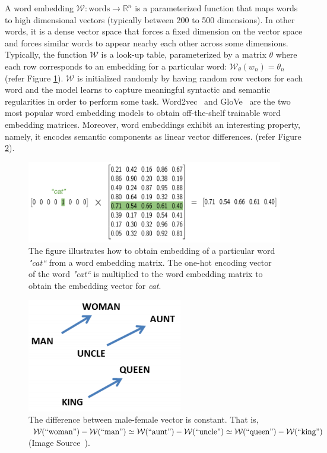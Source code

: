 A word embedding $\mathcal{W} : \text{words} \rightarrow \mathbb{R}^n$ is a parameterized function that maps words to high dimensional vectors (typically between 200 to 500 dimensions). In other words, it is a dense vector space that forces a fixed dimension on the vector space and forces similar words to appear nearby each other across some dimensions. Typically, the function $\mathcal{W}$ is a look-up table, parameterized by a matrix $\theta$ where each row corresponds to an embedding for a particular word: $\mathcal{W}_{\theta} (w_n) = \theta_n$ (refer Figure \ref{fig:word-embedding-matrix}). $\mathcal{W}$ is initialized randomly by having random row vectors for each word and the model learns to capture meaningful syntactic and semantic regularities in order to perform some task. Word2vec~\cite{mikolov2013distributed} and GloVe~\cite{pennington2014glove} are the two most popular word embedding models to obtain off-the-shelf trainable word embedding matrices. Moreover, word embeddings exhibit an interesting property, namely, it encodes semantic components as linear vector differences. (refer Figure \ref{fig:linear-vector}). 
 

\begin{figure}[!htb]
    \centering
    \includegraphics[scale=0.5]{Figures/word-embedding-matrix.png}
    \caption{The figure illustrates how to obtain embedding of a particular word \emph{"cat``} from a word embedding matrix. The one-hot encoding vector of the word \emph{"cat``} is multiplied to the word embedding matrix to obtain the embedding vector for \emph{cat}.}
    \label{fig:word-embedding-matrix}
\end{figure}


\begin{figure}[!htb]
    \centering
    \includegraphics[scale=0.5]{Figures/Mikolov-GenderVecs.png}
    \caption{The difference between male-female vector is constant. That is, $\mathcal{W}(``\text{woman}") - \mathcal{W}(``\text{man}") \simeq \mathcal{W}(``\text{aunt}") - \mathcal{W}(``\text{uncle}") \simeq \mathcal{W}(``\text{queen}") - \mathcal{W}(``\text{king}")$ (Image Source~\cite{mikolov2013distributed}).}
    \label{fig:linear-vector}
\end{figure}


